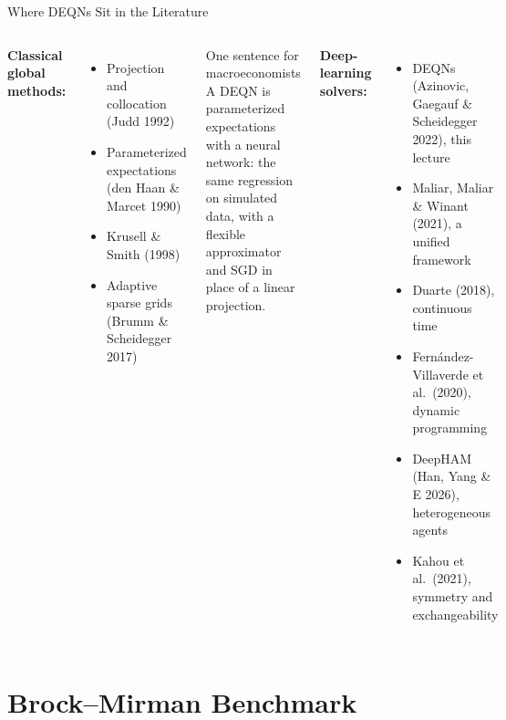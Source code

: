\documentclass[aspectratio=169,11pt]{beamer}
\newcommand{\emphc}[1]{\textcolor{harvardcrimson}{#1}}
\begin{document}
\begin{frame}{Where DEQNs Sit in the Literature}
\begin{columns}[T]
\textbf{Classical global methods:}
\begin{itemize}\itemsep1pt
    \item Projection and collocation (Judd 1992)
    \item Parameterized expectations (den Haan \& Marcet 1990)
    \item Krusell \& Smith (1998)
    \item Adaptive sparse grids (Brumm \& Scheidegger 2017)
\end{itemize}

\vspace{0.4em}
\begin{exampleblock}{One sentence for macroeconomists}
\footnotesize
A DEQN is \emphc{parameterized expectations with a neural network}: the same regression on simulated data, with a flexible approximator and SGD in place of a linear projection.
\end{exampleblock}

\textbf{Deep-learning solvers:}
\begin{itemize}\itemsep1pt
    \item \emphc{DEQNs} (Azinovic, Gaegauf \& Scheidegger 2022), this lecture
    \item Maliar, Maliar \& Winant (2021), a unified framework
    \item Duarte (2018), continuous time
    \item Fern\'andez-Villaverde et al.\ (2020), dynamic programming
    \item \emphc{DeepHAM} (Han, Yang \& E 2026), heterogeneous agents
    \item Kahou et al.\ (2021), symmetry and exchangeability
\end{itemize}
\end{columns}
\end{frame}


\section{Brock--Mirman Benchmark}
\end{document}
